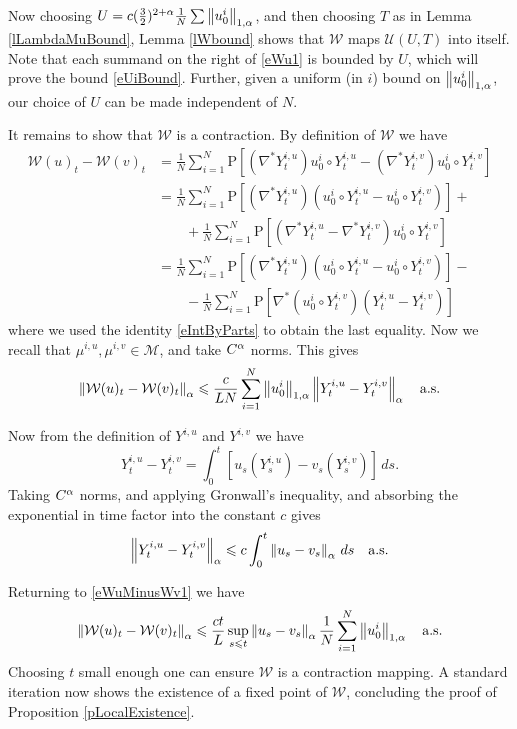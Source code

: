\documentclass[final]{amsart}%
\newcommand{\transpose}{^*}
\newcommand{\grad}{\nabla}
\newcommand{\gradt}{\grad\transpose}
\renewcommand{\leq}{\leqslant}
\newcommand{\lhp}{\boldsymbol{\mathrm{P}}}
\newcommand{\as}{\text{a.s.}}
\newcommand{\W}{\mathcal{W}}
\newcommand{\holderspace}[2]{\ensuremath{C^{\ifx0#1{#2}\else{#1,#2}\fi}}}
\newcommand{\U}{\mathcal{U}}
\newcommand{\M}{\mathcal{M}}
\newif\iftextstyle
\newcommand{\norm}[1]{\iftextstyle\lVert#1\rVert\else\left\lVert#1\right\rVert\fi}
\newcommand{\holdernorm}[3]{\norm{#1}_{\ifx0#2{#3}\else{#2,#3}\fi}}
\numberwithin{equation}{section}
\theoremstyle{definition}
\theoremstyle{remark}
\begin{document}
Now choosing $U = c(\frac{3}{2})^{2+\alpha} \frac{1}{N} \sum
\holdernorm{u^i_0}{1}{\alpha}$, and then choosing $T$ as in Lemma
\ref{lLambdaMuBound}, Lemma \ref{lWbound} shows that $\W$ maps
$\U(U,T)$ into itself. Note that each summand on the right of
\eqref{eWu1} is bounded by $U$, which will prove the bound
\eqref{eUiBound}. Further, given a uniform (in $i$) bound on
$\holdernorm{u^i_0}{1}{\alpha}$, our choice of $U$ can be made
independent of $N$.

It remains to show that $\W$ is a contraction. By definition of $\W$ we have
\begin{align*}
  \W(u)_t - \W(v)_t &= \frac{1}{N} \sum_{i=1}^N \lhp\left[ (\gradt Y^{i,u}_t)
    u^i_0 \circ Y^{i,u}_t - (\gradt Y^{i,v}_t) u^i_0 \circ Y^{i,v}_t
  \right]\\ 
  &= \frac{1}{N} \sum_{i=1}^N \lhp\left[ (\gradt Y^{i,u}_t) \left( u^i_0 \circ
      Y^{i,u}_t  - u^i_0 \circ Y^{i,v}_t \right)\right] +\\ 
  &\qquad + \frac{1}{N}\sum_{i=1}^N \lhp\left[ \left( \gradt Y^{i,u}_t -
      \gradt Y^{i,v}_t \right) u^i_0 \circ Y^{i,v}_t \right]\\ 
  &= \frac{1}{N} \sum_{i=1}^N \lhp\left[ (\gradt Y^{i,u}_t) \left( u^i_0 \circ
      Y^{i,u}_t  - u^i_0 \circ Y^{i,v}_t \right)\right] -\\ 
  &\qquad- \frac{1}{N}\sum_{i=1}^N \lhp\left[ \gradt (u^i_0 \circ Y^{i,v}_t)
    \left( Y^{i,u}_t - Y^{i,v}_t \right) \right]
\end{align*}
where we used the identity \eqref{eIntByParts} to obtain the last
equality. Now we recall that $\mu^{i,u}, \mu^{i,v} \in \M$, and take
$\holderspace{0}{\alpha}$ norms. This gives
\begin{equation}\label{eWuMinusWv1}
  \holdernorm{\W(u)_t - \W(v)_t}{0}{\alpha} \leq \frac{c}{L N} \sum_{i=1}^N
  \holdernorm{u^i_0}{1}{\alpha} \holdernorm{Y^{i,u}_t -
    Y^{i,v}_t}{0}{\alpha} \quad\as 
\end{equation}

Now from the definition of $Y^{i,u}$ and $Y^{i,v}$ we have
$$
Y^{i,u}_t - Y^{i,v}_t = \int_0^t \left[ u_s(Y^{i,u}_s) -
  v_s(Y^{i,v}_s) \right] \, ds. 
$$
Taking $\holderspace{0}{\alpha}$ norms, and applying Gronwall's
inequality, and absorbing the exponential in time factor into the
constant $c$ gives
$$
\holdernorm{Y^{i,u}_t - Y^{i,v}_t}{0}{\alpha} \leq c \int_0^t
\holdernorm{u_s - v_s}{0}{\alpha} \, ds \quad\as
$$

Returning to \eqref{eWuMinusWv1} we have
$$
\holdernorm{ \W(u)_t - \W(v)_t }{0}{\alpha} \leq \frac{c t}{L}
\sup_{s\leq t} \holdernorm{u_s - v_s}{0}{\alpha} \frac{1}{N} \sum_{i=1}^N
\holdernorm{ u^i_0 }{1}{\alpha} \quad\as
$$
Choosing $t$ small enough one can ensure $\W$ is a contraction
mapping. A standard iteration now shows the existence of a fixed point
of $\W$, concluding the proof of Proposition \ref{pLocalExistence}.
\end{document}
